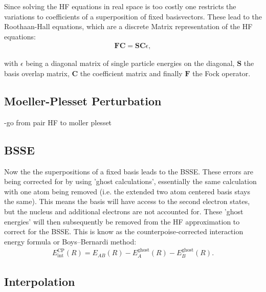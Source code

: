 Since solving the \ac{HF} equations in real space is too costly one restricts the variations to coefficients of a superposition of fixed basisvectors. These lead to the Roothaan-Hall equations, which are a discrete Matrix representation of the \ac{HF} equations:
\begin{align}
	\mathbf{F C}=\mathbf{S C} \epsilon,
\end{align} 

with $\epsilon$ being a diagonal matrix of single particle energies on the diagonal, $\mathbf{S}$ the basis overlap matrix, $\mathbf{C}$ the coefficient matrix and finally $\mathbf{F}$ the Fock operator.
\subsection{Moeller-Plesset Perturbation}
-go from pair HF to moller plesset
\subsection{\ac{BSSE}}
Now the the superpositions of a fixed basis leads to the \ac{BSSE}. These errors are being corrected for by using 'ghost calculations', essentially the same calculation with one atom being removed (i.e. the extended two atom centered basis stays the same). This means the basis will have access to the second electron states, but the nucleus and additional electrons are not accounted for. These 'ghost energies' will then subsequently be removed from the \ac{HF}
approximation to correct for the \ac{BSSE}.
This is know as the counterpoise‐corrected interaction energy formula or Boys–Bernardi method: %
\begin{align}
	E_{\text {int}}^{\text {CP}}(R)=E_{A B}(R)-E_A^{\text {ghost}}(R)-E_B^{\text {ghost}}(R).
\end{align}

\subsection{Interpolation}

